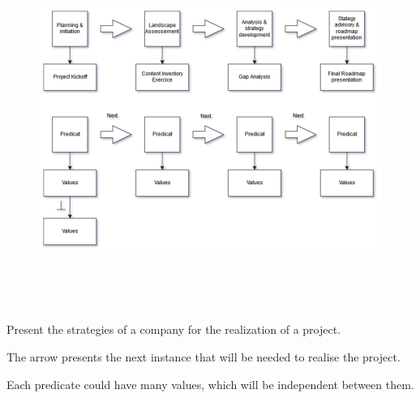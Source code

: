 \documentclass[12pt]{report}
\begin{document}
\begin{figure}[H]
	\begin{Center}
		\includegraphics[width=6.3in,height=4.53in]{./media/image7.png}
	\end{Center}
\end{figure}



\par

Present the strategies of a company for the realization of a project. \par
The arrow presents the next instance that will be needed to realise the project.  \par
Each predicate could have many values, which will be independent between them. \par
\end{document}
